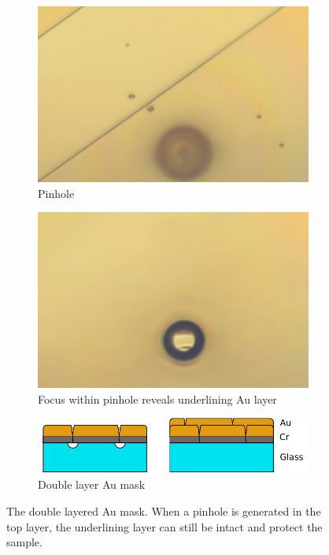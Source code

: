 \documentclass[final]{jyflluk}
\begin{document}
\begin{figure}[!h]
    \centering    
    \begin{subfigure}{0.49\textwidth}
        \centering
        \includegraphics[width=\linewidth]{optical/pinhole00.png} 
        \caption{Pinhole} \label{fig:pinholee}
    \end{subfigure}
    \hfill
    \begin{subfigure}{0.50\textwidth}
        \centering
        \includegraphics[width=\linewidth]{optical/pinhole01.png} 
        \caption{Focus within pinhole reveals underlining Au layer} \label{fig:pinholeee}
    \end{subfigure}
    
    \vspace{0.2cm}
    \begin{subfigure}{\textwidth}
    \centering
        \includegraphics[width=\linewidth]{images/pinhol.pdf} 
        \caption{Double layer Au mask} \label{fig:mask_idea}
    \end{subfigure}
    \caption{The double layered Au mask. When a pinhole is generated in the top layer, the underlining layer can still be intact and protect the sample.} \label{fig:multilayer_mask}
\end{figure}
\end{document}
